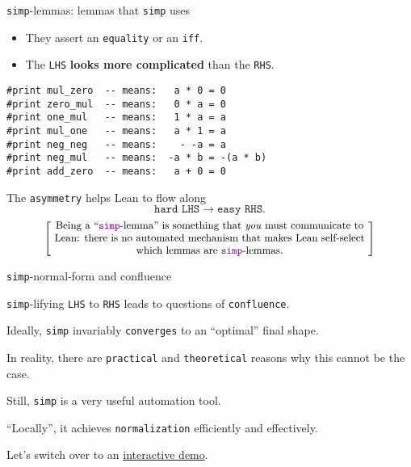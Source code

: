 \documentclass{beamer}
\begin{document}
\begin{frame}[fragile]{{\color{violet}\texttt{simp}}-lemmas: lemmas that {\color{violet}\texttt{simp}} uses}
\vphantom{}
\vspace{-13pt}
\begin{itemize}
\setlength\itemsep{-12pt}
\item
  They assert an {\color{violet}\verb`equality`} or an {\color{violet}\verb`iff`}.
\item
  The {\color{violet}\verb`LHS`} {\textbf{looks more complicated}} than the {\color{violet}\verb`RHS`}.
\end{itemize}
\vspace{-20pt}
\begin{verbatim}
#print mul_zero  -- means:   a * 0 = 0
#print zero_mul  -- means:   0 * a = 0
#print one_mul   -- means:   1 * a = a
#print mul_one   -- means:   a * 1 = a
#print neg_neg   -- means:    - -a = a
#print neg_mul   -- means:  -a * b = -(a * b)
#print add_zero  -- means:   a + 0 = 0
\end{verbatim}
\vspace{-10pt}
The {\color{violet}\verb`asymmetry`} helps Lean to flow along
$$
  {\texttt{hard LHS}} \longrightarrow {\texttt{easy RHS}}.
$$
\[
  \left[ \;
  \parbox{0.8\textwidth}{\centering\small
  Being a ``{\color{violet}\texttt{simp}}-lemma'' is something that {\emph{you}} must communicate to Lean: there is no automated mechanism that makes Lean self-select which lemmas are {\color{violet}\texttt{simp}}-lemmas.
  }
  \; \right]
\]
\end{frame}

\begin{frame}[fragile]{{\color{violet}\texttt{simp}}-normal-form and confluence}

{\color{violet}\verb`simp`}-lifying {\color{violet}\verb`LHS`} to {\color{violet}\verb`RHS`} leads to questions of {\color{violet}\verb`confluence`}.

Ideally, {\color{violet}\verb`simp`} invariably {\color{violet}\verb`converges`} to an ``optimal'' final shape.

In reality, there are {\color{violet}\verb`practical`} and {\color{violet}\verb`theoretical`} reasons why this cannot be the case.

Still, {\color{violet}\verb`simp`} is a very useful automation tool.

``Locally'', it achieves {\color{violet}\verb`normalization`} efficiently and effectively.
\end{frame}

\begin{frame}[fragile]

Let's switch over to an \href{https://leanprover-community.github.io/lean-web-editor/#url=https%3A%2F%2Fraw.githubusercontent.com%2Fadomani%2FAtelier_Lean_2023%2Fadomani_polys%2Fsrc%2Fgeneralizations%2F1.generalizations.presentationTemplate.lean}{interactive demo}.
\end{frame}
\end{document}
